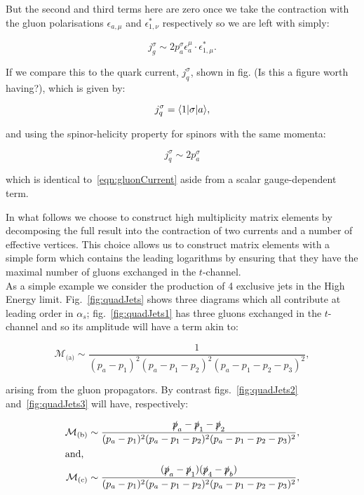 		But the second and third terms here are zero once we take the contraction with the gluon polarisations $\epsilon_{a, \mu}$
		and $\epsilon_{1, \nu}^*$ respectively so we are left with simply:

		\begin{equation}
			j_{g}^\sigma \sim 2p_a^\sigma\epsilon_{a}^\mu\cdot\epsilon_{1, \mu}^*.
			\label{eqn:gluonCurrent}
		\end{equation}

		If we compare this to the quark current, $j_{q}^\sigma$, shown in fig. (Is this a figure worth having?),
		which is given by:

		\begin{equation}
			j_{q}^\sigma = \langle 1 | \sigma | a \rangle,
		\end{equation}

		and using the spinor-helicity property for spinors with the same momenta:

		\begin{equation}
			j_{q}^\sigma \sim 2p_a^\sigma
		\end{equation}

		which is identical to~\eqref{eqn:gluonCurrent} aside from a scalar gauge-dependent term.

		In what
		follows we choose to construct high multiplicity matrix elements by decomposing the full result
		into the contraction of two currents and a number of effective vertices.  This choice allows us
		to construct matrix elements with a simple form which contains the leading logarithms by
		ensuring that they have the maximal number of gluons exchanged in the $t$-channel.\\
		As a simple example we consider the production of 4 exclusive jets in the High Energy limit.
		Fig.~\eqref{fig:quadJets} shows three diagrams which all contribute at leading order in $\alpha_s$;
		fig.~\eqref{fig:quadJets1} has three gluons exchanged in the $t$-channel and so its amplitude will
		have a term akin to:

		\begin{equation}
			\mathcal{M}_{\text{(a)}}\sim\frac{1}{(p_a - p_1)^2(p_a - p_1 - p_2)^2(p_a - p_1 - p_2 - p_3)^2},
		\end{equation}

		arising from the gluon propagators.  By contrast figs.~\eqref{fig:quadJets2} and~\eqref{fig:quadJets3} will
		have, respectively:

		\begin{align}
			\mathcal{M}_{\text{(b)}}\sim\frac{\slashed p_a - \slashed p_1 - \slashed p_2}
			{(p_a - p_1)^2(p_a - p_1 - p_2)^2(p_a - p_1 - p_2 - p_3)^2},\\
			\intertext{and,}
			\mathcal{M}_{\text{(c)}}\sim\frac{(\slashed p_a - \slashed p_1)(\slashed p_4 - \slashed p_b)}
			{(p_a - p_1)^2(p_a - p_1 - p_2)^2(p_a - p_1 - p_2 - p_3)^2},
		\end{align}

